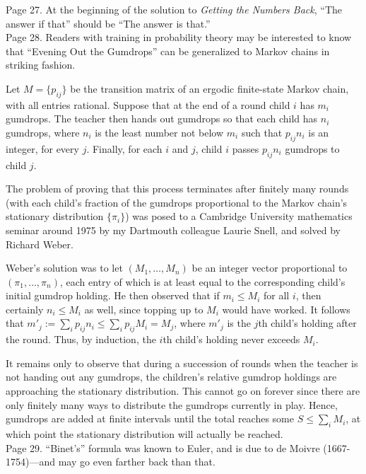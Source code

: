 \documentclass[11pt]{article}
\begin{document}
Page 27. At the beginning of the solution to {\em Getting the Numbers Back},
``The answer if that'' should be ``The answer is that.''\\

Page 28.  Readers with training in probability theory may be interested to know that
``Evening Out the Gumdrops'' can be generalized to Markov chains in striking fashion.

Let $M = \{p_{ij}\}$ be the transition matrix of an ergodic finite-state Markov chain,
with all entries rational.  Suppose that at the end of a round child $i$ has $m_i$ gumdrops.
The teacher then hands out gumdrops so that each child has $n_i$ gumdrops, where
$n_i$ is the least number not below $m_i$ such that $p_{ij}n_i$ is an integer, for every $j$.  Finally,
for each $i$ and $j$, child $i$ passes $p_{ij}n_i$ gumdrops to child $j$.

The problem of proving that this process terminates after finitely many rounds
(with each child's fraction of the gumdrops proportional to the Markov chain's
stationary distribution $\{\pi_i\}$) was posed to a Cambridge University mathematics seminar
around 1975 by my Dartmouth colleague Laurie Snell, and solved by Richard Weber.

Weber's solution was to let $(M_1,\dots,M_n)$ be an integer vector proportional
to $(\pi_1,\dots,\pi_n)$, each entry of which is at least equal to the corresponding child's
initial gumdrop holding.  He then observed that if $m_i \le M_i$ for all $i$, then 
certainly $n_i \le M_i$ as well, since topping up to $M_i$ would have worked.
It follows that $m'_j := \sum_i p_{ij} n_i \le \sum_i p_{ij} M_i = M_j$, where
$m'_j$ is the $j$th child's holding after the round.  Thus, by induction, the $i$th
child's holding never exceeds $M_i$.

It remains only to observe that during a succession of rounds when the teacher is
not handing out any gumdrops, the children's relative gumdrop holdings are approaching
the stationary distribution.  This cannot go on forever since there are only finitely
many ways to distribute the gumdrops currently in play.  Hence, gumdrops are added
at finite intervals until the total reaches some $S \le \sum_i M_i$, at which point
the stationary distribution will actually be reached.\\

Page 29.  ``Binet's'' formula was known to Euler, and is due to de Moivre (1667-1754)---and
may go even farther back than that.\\
\end{document}
